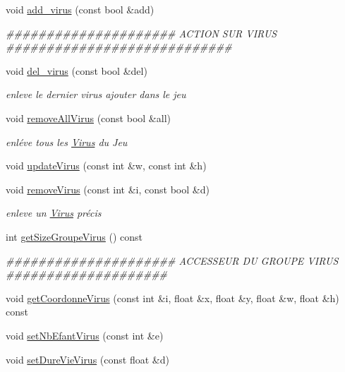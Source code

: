 \begin{DoxyCompactItemize}
void \hyperlink{classGameModel_aa42dce0783fd5906209264fc1abfc0b7}{add\_\-virus} (const bool \&add)
\begin{DoxyCompactList}\small\item\em \#\#\#\#\#\#\#\#\#\#\#\#\#\#\#\#\#\#\#\#\# ACTION SUR VIRUS \#\#\#\#\#\#\#\#\#\#\#\#\#\#\#\#\#\#\#\#\#\#\#\#\#\#\#\# \end{DoxyCompactList}\item 
void \hyperlink{classGameModel_aacfc9012c0cb1de9cf9d54cafe1b6455}{del\_\-virus} (const bool \&del)
\begin{DoxyCompactList}\small\item\em enleve le dernier virus ajouter dans le jeu \end{DoxyCompactList}\item 
void \hyperlink{classGameModel_a8c74ed4f587a45da6b2aa269cd24522d}{removeAllVirus} (const bool \&all)
\begin{DoxyCompactList}\small\item\em enléve tous les \hyperlink{classVirus}{Virus} du Jeu \end{DoxyCompactList}\item 
void \hyperlink{classGameModel_a31425a5c7fab0e913a728835262b0c5b}{updateVirus} (const int \&w, const int \&h)
\item 
void \hyperlink{classGameModel_a6eca407d976aac584a20467315ad44f5}{removeVirus} (const int \&i, const bool \&d)
\begin{DoxyCompactList}\small\item\em enleve un \hyperlink{classVirus}{Virus} précis \end{DoxyCompactList}\item 
int \hyperlink{classGameModel_a71b65988d8b81efd57c5b9c9a9996fb6}{getSizeGroupeVirus} () const 
\begin{DoxyCompactList}\small\item\em \#\#\#\#\#\#\#\#\#\#\#\#\#\#\#\#\#\#\#\#\# ACCESSEUR DU GROUPE VIRUS \#\#\#\#\#\#\#\#\#\#\#\#\#\#\#\#\#\#\#\# \end{DoxyCompactList}\item 
void \hyperlink{classGameModel_abf1fe4a3833d5417d56c0600544663b8}{getCoordonneVirus} (const int \&i, float \&x, float \&y, float \&w, float \&h) const 
\item 
void \hyperlink{classGameModel_aecbb3d1bb4f65cf89326bcb7e3818b8a}{setNbEfantVirus} (const int \&e)
\item 
void \hyperlink{classGameModel_a1429d5cf32bf513d807425ea7181322e}{setDureVieVirus} (const float \&d)

\end{DoxyCompactItemize}
